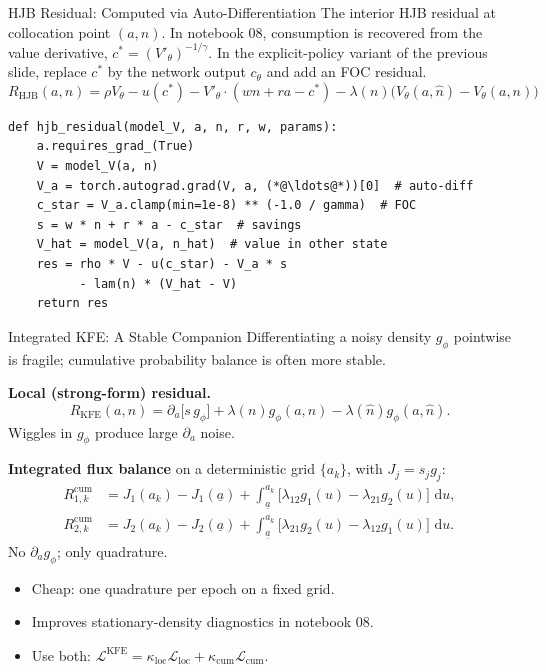 \documentclass[aspectratio=169,11pt]{beamer}
\newcommand{\ud}{\,\mathrm{d}}
\newcommand{\ubar}[1]{\underline{#1}}
\begin{document}
\begin{frame}[fragile]{HJB Residual: Computed via Auto-Differentiation}
\small
The interior HJB residual at collocation point $(a, n)$.  In notebook 08, consumption is recovered from the value derivative, $c^* = (V'_\theta)^{-1/\gamma}$.  In the explicit-policy variant of the previous slide, replace $c^*$ by the network output $c_\theta$ and add an FOC residual.
\vspace{-0.3em}
\[
R_{\text{HJB}}(a,n) = \rho V_\theta - u(c^*) - V'_\theta \cdot (wn + ra - c^*) - \lambda(n)\big(V_\theta(a,\hat{n}) - V_\theta(a,n)\big)
\]
\vspace{-0.5em}
\begin{lstlisting}
def hjb_residual(model_V, a, n, r, w, params):
    a.requires_grad_(True)
    V = model_V(a, n)
    V_a = torch.autograd.grad(V, a, (*@\ldots@*))[0]  # auto-diff
    c_star = V_a.clamp(min=1e-8) ** (-1.0 / gamma)  # FOC
    s = w * n + r * a - c_star  # savings
    V_hat = model_V(a, n_hat)  # value in other state
    res = rho * V - u(c_star) - V_a * s
          - lam(n) * (V_hat - V)
    return res
\end{lstlisting}
\end{frame}

\begin{frame}{Integrated KFE: A Stable Companion}
\footnotesize
Differentiating a noisy density $g_\phi$ pointwise is fragile; cumulative probability balance is often more stable.

\vspace{0.2em}
\textbf{Local (strong-form) residual.}
\vspace{-0.3em}
\[
R_{\text{KFE}}(a,n) = \partial_a\!\bigl[s\,g_\phi\bigr] + \lambda(n)g_\phi(a,n) - \lambda(\hat n)g_\phi(a,\hat n).
\]
Wiggles in $g_\phi$ produce large $\partial_a$ noise.

\vspace{0.2em}
\textbf{Integrated flux balance} on a deterministic grid $\{a_k\}$, with $J_j=s_jg_j$:
\vspace{-0.3em}
\[
\begin{aligned}
R_{1,k}^{\text{cum}}
&= J_1(a_k)-J_1(\ubar a)
   + \int_{\ubar a}^{a_k}\!\bigl[\lambda_{12}g_1(u)-\lambda_{21}g_2(u)\bigr]\,\ud u,\\
R_{2,k}^{\text{cum}}
&= J_2(a_k)-J_2(\ubar a)
   + \int_{\ubar a}^{a_k}\!\bigl[\lambda_{21}g_2(u)-\lambda_{12}g_1(u)\bigr]\,\ud u.
\end{aligned}
\]
No $\partial_a g_\phi$; only quadrature.

\vspace{0.1em}
\begin{itemize}\itemsep0pt
    \item Cheap: one quadrature per epoch on a fixed grid.
    \item Improves stationary-density diagnostics in notebook 08.
    \item Use both: $\mathcal L^{\text{KFE}}=\kappa_{\text{loc}}\mathcal L_{\text{loc}}+\kappa_{\text{cum}}\mathcal L_{\text{cum}}$.
\end{itemize}
\end{frame}
\end{document}
